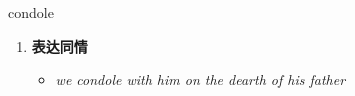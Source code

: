 
\begin{frame}
{\huge condole}
\begin{center}
\begin{enumerate}\Large
  \item \textbf{表达同情}
  \begin{itemize}
    \item \em{\Large{we condole with him on the dearth of his father}}
  \end{itemize}
\end{enumerate}
\end{center}
\end{frame}
